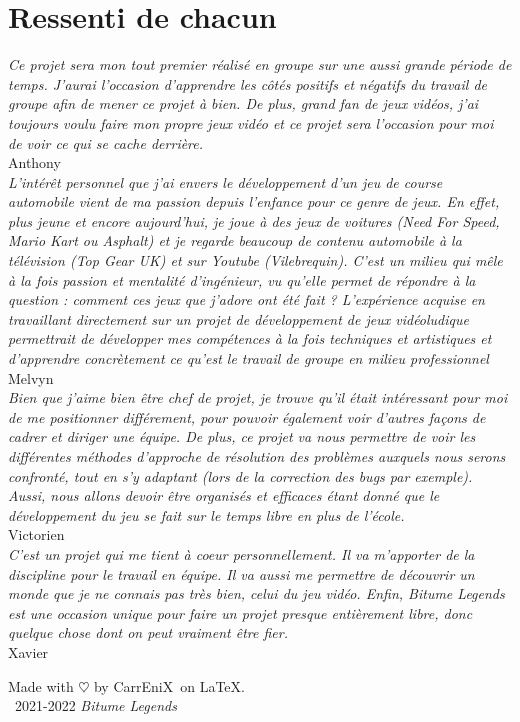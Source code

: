\documentclass[12pt,a4paper]{article}
\newcommand{\btmlgs}{\textit{Bitume Legends}}
\newcommand{\CEX}{CarrEniX}
\begin{document}
\section{Ressenti de chacun}
  \indent\textit{Ce projet sera mon tout premier réalisé en groupe sur une aussi 
  grande période de temps. J'aurai l'occasion d'apprendre les côtés positifs et 
  négatifs du travail de groupe afin de mener ce projet à bien. De plus, grand
  fan de jeux vidéos, j'ai toujours voulu faire mon propre jeux vidéo et ce 
  projet sera l'occasion pour moi de voir ce qui se cache derrière.} \\
  \indent Anthony\\[0.3cm]
  \indent\textit{L'intérêt personnel que j'ai envers le développement d'un jeu 
  de course automobile vient de ma passion depuis l'enfance pour ce genre de 
  jeux. En effet, plus jeune et encore aujourd'hui, je joue à des jeux de 
  voitures (Need For Speed, Mario Kart ou Asphalt) et je regarde beaucoup 
  de contenu automobile à la télévision (Top Gear UK) et sur Youtube 
  (Vilebrequin). C'est un milieu qui mêle à la fois passion et mentalité 
  d'ingénieur, vu qu'elle permet de répondre à la question : comment ces 
  jeux que j'adore ont été fait ? L'expérience acquise en travaillant 
  directement sur un projet de développement de jeux vidéoludique 
  permettrait de développer mes compétences à la fois techniques et 
  artistiques et d'apprendre concrètement ce qu'est le travail de groupe en 
  milieu professionnel} \\
  \indent Melvyn\\[0.3cm]
  \indent\textit{Bien que j'aime bien être chef de projet, je trouve qu'il était 
  intéressant pour moi de me positionner différement, pour pouvoir également voir 
  d'autres façons de cadrer et diriger une équipe. De plus, ce projet va nous
  permettre de voir les différentes méthodes d'approche de résolution des 
  problèmes auxquels nous serons confronté, tout en s'y adaptant (lors de la 
  correction des bugs par exemple). Aussi, nous allons devoir être organisés
  et efficaces étant donné que le développement du jeu se fait sur le temps 
  libre en plus de l'école.} \\
  \indent Victorien\\[0.3cm]
  \indent\textit{C'est un projet qui me tient à coeur personnellement. Il 
  va m'apporter de la discipline pour le travail en équipe. Il va aussi me 
  permettre de découvrir un monde que je ne connais pas très bien, celui du 
  jeu vidéo. Enfin, Bitume Legends est une occasion unique pour faire un projet 
  presque entièrement libre, donc quelque chose dont on peut vraiment être fier.} \\
  \indent Xavier
\clearpage

\begin{thebibliography}{9}
  
\end{thebibliography}
  
\begin{center}
  Made with $\heartsuit$ by \CEX\, on \LaTeX.\\
  \textcopyright\, 2021-2022 \btmlgs
\end{center}
\clearpage
\end{document}

